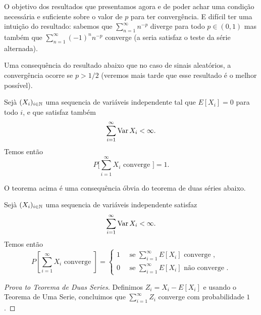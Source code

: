 \begin{topics}
O objetivo dos resultados que presentamos agora e de poder achar uma condição necessária e suficiente sobre o valor de $p$ para ter convergência.
E difícil ter uma intuição do resultado: sabemos que  $\sum_{n=1}^{\infty} n^{-p}$ diverge para todo $p\in (0,1)$ mas também que
$\sum_{n=1}^{\infty}(-1)^n n^{-p}$ converge (a seria satisfaz o teste da série alternada).

\medskip

Uma consequência do resultado abaixo que no caso de sinais aleatórios, a convergência ocorre se $p > 1/2$ (veremos mais tarde que esse resultado é o melhor possível).

\begin{theorem}
  Sejà $(X_i)_{i\in {\ensuremath{\mathbb N}}}$ uma sequencia de variáveis independente tal que $E[X_i]=0$ para todo $i$, e que satisfaz também
  \begin{equation}
    \sum_{i=1}^\infty \operatorname{Var} X_i<\infty.
  \end{equation}
  Temos então
  \begin{equation}
    P \Big[ \sum_{i=1}^{\infty} X_i \text{ converge } \Big] = 1.
\end{equation}
\end{theorem}

O teorema acima é uma consequência óbvia do teorema de duas séries abaixo.

\begin{theorem}
  Sejà $(X_i)_{i\in {\ensuremath{\mathbb N}}}$ uma sequencia de variáveis independente satisfaz
  \begin{equation}
    \sum_{i=1}^\infty \operatorname{Var} X_i<\infty.
  \end{equation}
  Temos então
  \begin{equation}
    P[\sum_{i=1}^{\infty} X_i \text{ converge } ] =
    \begin{cases}
      1 \quad \text{ se } \sum_{i=1}^\infty E[X_i] \text{ converge },\\
      0 \quad \text{ se } \sum_{i=1}^\infty E[X_i] \text{ não converge }.
    \end{cases}
  \end{equation}
\end{theorem}

\begin{proof}[Prova to Teorema de Duas Series]
  Definimos $Z_i = X_i - E[X_i]$ e usando o Teorema de Uma Serie, concluimos que $\sum_{i=1}^{\infty} Z_i$ converge com probabilidade $1$.

  \medskip


\end{proof}
\end{topics}
